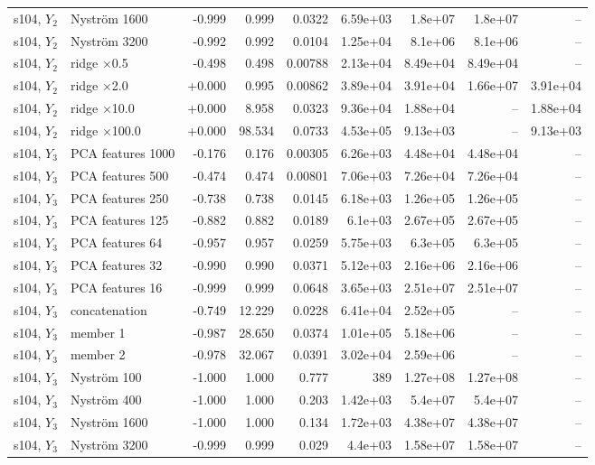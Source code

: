 \begin{landscape}
{\begin{longtable}{llrrrrrrr}
s104, $Y_2$ & Nystr\"om 1600 & -0.999 & 0.999 & 0.0322 & 6.59e+03 & 1.8e+07 & 1.8e+07 & -- \\
s104, $Y_2$ & Nystr\"om 3200 & -0.992 & 0.992 & 0.0104 & 1.25e+04 & 8.1e+06 & 8.1e+06 & -- \\
s104, $Y_2$ & ridge $\times$0.5 & -0.498 & 0.498 & 0.00788 & 2.13e+04 & 8.49e+04 & 8.49e+04 & -- \\
s104, $Y_2$ & ridge $\times$2.0 & +0.000 & 0.995 & 0.00862 & 3.89e+04 & 3.91e+04 & 1.66e+07 & 3.91e+04 \\
s104, $Y_2$ & ridge $\times$10.0 & +0.000 & 8.958 & 0.0323 & 9.36e+04 & 1.88e+04 & -- & 1.88e+04 \\
s104, $Y_2$ & ridge $\times$100.0 & +0.000 & 98.534 & 0.0733 & 4.53e+05 & 9.13e+03 & -- & 9.13e+03 \\
s104, $Y_3$ & PCA features 1000 & -0.176 & 0.176 & 0.00305 & 6.26e+03 & 4.48e+04 & 4.48e+04 & -- \\
s104, $Y_3$ & PCA features 500 & -0.474 & 0.474 & 0.00801 & 7.06e+03 & 7.26e+04 & 7.26e+04 & -- \\
s104, $Y_3$ & PCA features 250 & -0.738 & 0.738 & 0.0145 & 6.18e+03 & 1.26e+05 & 1.26e+05 & -- \\
s104, $Y_3$ & PCA features 125 & -0.882 & 0.882 & 0.0189 & 6.1e+03 & 2.67e+05 & 2.67e+05 & -- \\
s104, $Y_3$ & PCA features 64 & -0.957 & 0.957 & 0.0259 & 5.75e+03 & 6.3e+05 & 6.3e+05 & -- \\
s104, $Y_3$ & PCA features 32 & -0.990 & 0.990 & 0.0371 & 5.12e+03 & 2.16e+06 & 2.16e+06 & -- \\
s104, $Y_3$ & PCA features 16 & -0.999 & 0.999 & 0.0648 & 3.65e+03 & 2.51e+07 & 2.51e+07 & -- \\
s104, $Y_3$ & concatenation & -0.749 & 12.229 & 0.0228 & 6.41e+04 & 2.52e+05 & -- & -- \\
s104, $Y_3$ & member 1 & -0.987 & 28.650 & 0.0374 & 1.01e+05 & 5.18e+06 & -- & -- \\
s104, $Y_3$ & member 2 & -0.978 & 32.067 & 0.0391 & 3.02e+04 & 2.59e+06 & -- & -- \\
s104, $Y_3$ & Nystr\"om 100 & -1.000 & 1.000 & 0.777 & 389 & 1.27e+08 & 1.27e+08 & -- \\
s104, $Y_3$ & Nystr\"om 400 & -1.000 & 1.000 & 0.203 & 1.42e+03 & 5.4e+07 & 5.4e+07 & -- \\
s104, $Y_3$ & Nystr\"om 1600 & -1.000 & 1.000 & 0.134 & 1.72e+03 & 4.38e+07 & 4.38e+07 & -- \\
s104, $Y_3$ & Nystr\"om 3200 & -0.999 & 0.999 & 0.029 & 4.4e+03 & 1.58e+07 & 1.58e+07 & -- \\

\end{longtable}}
\end{landscape}
